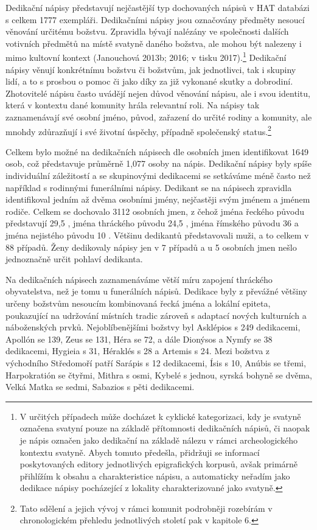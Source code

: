 Dedikační nápisy představují nejčastější typ dochovaných nápisů v HAT databázi s celkem 1777 exempláři. Dedikačními nápisy jsou označovány předměty nesoucí věnování určitému božstvu. Zpravidla bývají nalézány ve společnosti dalších votivních předmětů na místě svatyně daného božstva, ale mohou být nalezeny i mimo kultovní kontext (Janouchová 2013b; 2016; v tisku 2017).\footnote{V určitých případech může docházet k cyklické kategorizaci, kdy je svatyně označena svatyní pouze na základě přítomnosti dedikačních nápisů, či naopak je nápis označen jako dedikační na základě nálezu v rámci archeologického kontextu svatyně. Abych tomuto předešla, přidržuji se informací poskytovaných editory jednotlivých epigrafických korpusů, avšak primárně přihlížím k obsahu a charakteristice nápisu, a automaticky neřadím jako dedikace nápisy pocházející z lokality charakterizované jako svatyně.} Dedikační nápisy věnují konkrétnímu božstvu či božstvům, jak jednotlivci, tak i skupiny lidí, a to s prosbou o pomoc či jako díky za již vykonané skutky a dobrodiní. Zhotovitelé nápisu často uvádějí nejen důvod věnování nápisu, ale i svou identitu, která v kontextu dané komunity hrála relevantní roli. Na nápisy tak zaznamenávají své osobní jméno, původ, zařazení do určité rodiny a komunity, ale mnohdy zdůrazňují i své životní úspěchy, případně společenský status.\footnote{Tato sdělení a jejich vývoj v rámci komunit podrobněji rozebírám v chronologickém přehledu jednotlivých století pak v kapitole 6.}

Celkem bylo možné na dedikačních nápisech dle osobních jmen identifikovat 1649 osob, což představuje průměrně 1,077 osoby na nápis. Dedikační nápisy byly spíše individuální záležitostí a se skupinovými dedikacemi se setkáváme méně často než například s rodinnými funerálními nápisy. Dedikant se na nápisech zpravidla identifikoval jedním až dvěma osobními jmény, nejčastěji svým jménem a jménem rodiče. Celkem se dochovalo 3112 osobních jmen, z čehož jména řeckého původu představují 29,5 , jména thráckého původu 24,5 , jména římského původu 36  a jména nejistého původu 10 . Většinu dedikantů představovali muži, a to celkem v 88  případů. Ženy dedikovaly nápisy jen v 7  případů a u 5  osobních jmen nešlo jednoznačně určit pohlaví dedikanta.

Na dedikačních nápisech zaznamenáváme větší míru zapojení thráckého obyvatelstva, než je tomu u funerálních nápisů. Dedikace byly z převážné většiny určeny božstvům nesoucím kombinovaná řecká jména a lokální epiteta, poukazující na udržování místních tradic zároveň s adaptací nových kulturních a náboženských prvků. Nejoblíbenějšími božstvy byl Asklépios s 249 dedikacemi, Apollón se 139, Zeus se 131, Héra se 72, a dále Dionýsos a Nymfy se 38 dedikacemi, Hygieia s 31, Héraklés s 28 a Artemis s 24. Mezi božstva z východního Středomoří patří Sarápis s 12 dedikacemi, Ísis s 10, Anúbis se třemi, Harpokratión se čtyřmi, Mithra s osmi, Kybelé s jednou, syrská bohyně se dvěma, Velká Matka se sedmi, Sabazios s pěti dedikacemi.

